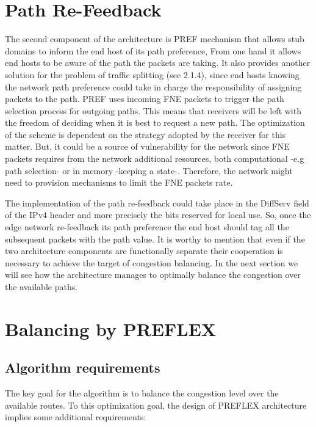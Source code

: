 \section{Path Re-Feedback}

The second component of the architecture is PREF mechanism that allows stub domains to inform the end host of its path preference, From one hand it allows end hosts to be aware of the path the packets are taking. It also provides another solution for the problem of traffic splitting (see 2.1.4), since end hosts knowing the network path preference could take in charge the responsibility of assigning packets to the path. PREF uses incoming FNE packets to trigger the path selection process for outgoing paths. This means that receivers will be left with the freedom of deciding when it is best to request a new path. The optimization of the scheme is dependent on the strategy adopted by the receiver for this matter. But, it could be a source of vulnerability for the network since FNE packets requires from the network  additional resources, both computational -e.g path selection- or in memory -keeping a state-. Therefore, the network might need to provision mechanisms to limit the FNE packets rate.

The implementation of the path re-feedback could take place in the DiffServ field of the IPv4 header and more precisely the bits reserved for local use. So, once the edge network re-feedback its path preference the end host should tag all the subsequent packets with the path value.
It is worthy to mention that even if the two architecture components are functionally separate their cooperation is necessary to achieve the target of congestion balancing. In the next section we will see how the architecture manages to optimally balance the congestion over the available paths.

\section{Balancing by PREFLEX}

\subsection{Algorithm requirements}
The key goal for the algorithm is to balance the congestion level over the available routes. To this optimization goal, the design of PREFLEX architecture implies some additional requirements: 

